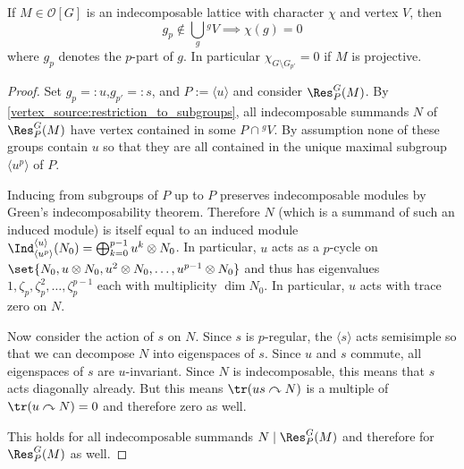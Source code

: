 \begin{theorem} \label{vertices:zero_of_characters_outside_of_vertex}
If $M\in\mathcal{O}[G]$ is an indecomposable lattice with character $\chi$ and vertex $V$, then
\[g_p \notin \bigcup_g {^gV} \implies \chi(g) = 0\]
where $g_p$ denotes the $p$-part of $g$. In particular $\chi_{G\setminus G_{p'}} = 0$ if $M$ is projective.
\end{theorem}
\begin{proof}
Set $g_p =: u$,$g_{p'}=: s$, and $P:=\langle u\rangle$ and consider $\Res_P^G(M)$. By \ref{vertex_source:restriction_to_subgroups}, all indecomposable summands $N$ of $\Res_P^G(M)$ have vertex contained in some $P\cap{^g V}$. By assumption none of these groups contain $u$ so that they are all contained in the unique maximal subgroup $\langle u^p \rangle$ of $P$.

Inducing from subgroups of $P$ up to $P$ preserves indecomposable modules by Green's indecomposability theorem. Therefore $N$ (which is a summand of such an induced module) is itself equal to an induced module $\Ind_{\langle u^p\rangle}^{\langle u\rangle}(N_0)=\bigoplus_{k=0}^{p-1} u^k \otimes N_0$. In particular, $u$ acts as a $p$-cycle on $\set{N_0, u\otimes N_0, u^2\otimes N_0, \ldots, u^{p-1}\otimes N_0}$ and thus has eigenvalues $1,\zeta_p, \zeta_p^2, \ldots, \zeta_p^{p-1}$ each with multiplicity $\dim N_0$. In particular, $u$ acts with trace zero on $N$.

Now consider the action of $s$ on $N$. Since $s$ is $p$-regular, the $\langle s\rangle$ acts semisimple so that we can decompose $N$ into eigenspaces of $s$. Since $u$ and $s$ commute, all eigenspaces of $s$ are $u$-invariant. Since $N$ is indecomposable, this means that $s$ acts diagonally already. But this means $\tr(us \curvearrowright N)$ is a multiple of $\tr(u \curvearrowright N)=0$ and therefore zero as well.

This holds for all indecomposable summands $N \mid \Res_P^G(M)$ and therefore for $\Res_P^G(M)$ as well.
\end{proof}